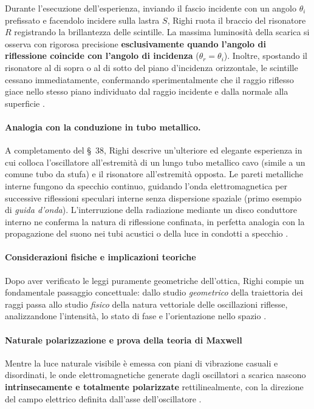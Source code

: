 Durante l'esecuzione dell'esperienza, inviando il fascio incidente con un angolo $\theta_i$ prefissato e facendolo incidere sulla lastra $S$, Righi ruota il braccio del risonatore $R$ registrando la brillantezza delle scintille. La massima luminosità della scarica si osserva con rigorosa precisione \textbf{esclusivamente quando l'angolo di riflessione coincide con l'angolo di incidenza} ($\theta_r = \theta_i$). Inoltre, spostando il risonatore al di sopra o al di sotto del piano d'incidenza orizzontale, le scintille cessano immediatamente, confermando sperimentalmente che il raggio riflesso giace nello stesso piano individuato dal raggio incidente e dalla normale alla superficie \cite{righi1897ottica}.

\paragraph{Analogia con la conduzione in tubo metallico.}
A completamento del \S~38, Righi descrive un'ulteriore ed elegante esperienza in cui colloca l'oscillatore all'estremità di un lungo tubo metallico cavo (simile a un comune tubo da stufa) e il risonatore all'estremità opposta. Le pareti metalliche interne fungono da specchio continuo, guidando l'onda elettromagnetica per successive riflessioni speculari interne senza dispersione spaziale (primo esempio di \emph{guida d'onda}). L'interruzione della radiazione mediante un disco conduttore interno ne conferma la natura di riflessione confinata, in perfetta analogia con la propagazione del suono nei tubi acustici o della luce in condotti a specchio \cite{righi1897ottica}.

\paragraph{Considerazioni fisiche e implicazioni teoriche}

Dopo aver verificato le leggi puramente geometriche dell'ottica, Righi compie un fondamentale passaggio concettuale: dallo studio \emph{geometrico} della traiettoria dei raggi passa allo studio \emph{fisico} della natura vettoriale delle oscillazioni riflesse, analizzandone l'intensità, lo stato di fase e l'orientazione nello spazio \cite{righi1897ottica}.

\paragraph{Naturale polarizzazione e prova della teoria di Maxwell}
Mentre la luce naturale visibile è emessa con piani di vibrazione casuali e disordinati, le onde elettromagnetiche generate dagli oscillatori a scarica nascono \textbf{intrinsecamente e totalmente polarizzate} rettilinealmente, con la direzione del campo elettrico definita dall'asse dell'oscillatore \cite{righi1897ottica}.

